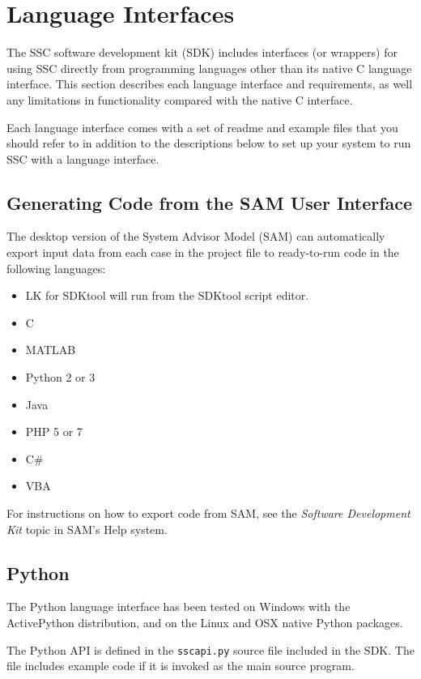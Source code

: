 \documentclass{scrartcl} %
\newcommand{\+}{\discretionary{\mbox{\scriptsize$\hookleftarrow$}}{}{}}
\begin{document}
\section{Language Interfaces}
\label{sec_language_interfaces}

The SSC software development kit (SDK) includes interfaces (or wrappers) for using SSC directly from programming languages other than its native C language interface.  This section describes each language interface and requirements, as well any limitations in functionality compared with the native C interface.

Each language interface comes with a set of readme and example files that you should refer to in addition to the descriptions below to set up your system to run SSC with a language interface.

\subsection{Generating Code from the SAM User Interface}

The desktop version of the System Advisor Model (SAM) can automatically export input data from each case in the project file to ready-to-run code in the following languages:

\begin{itemize}
\item LK for SDKtool will run from the SDKtool script editor.
\item C
\item MATLAB
\item Python 2 or 3
\item Java
\item PHP 5 or 7
\item C\#
\item VBA
\end{itemize}

For instructions on how to export code from SAM, see the \emph{Software Development Kit} topic in SAM's Help system. 

\subsection{Python}

The Python language interface has been tested on Windows with the ActivePython distribution, and on the Linux and OSX native Python packages.

The Python API is defined in the \texttt{sscapi.py} source file included in the SDK.  The file includes example code if it is invoked as the main source program.
\end{document}
